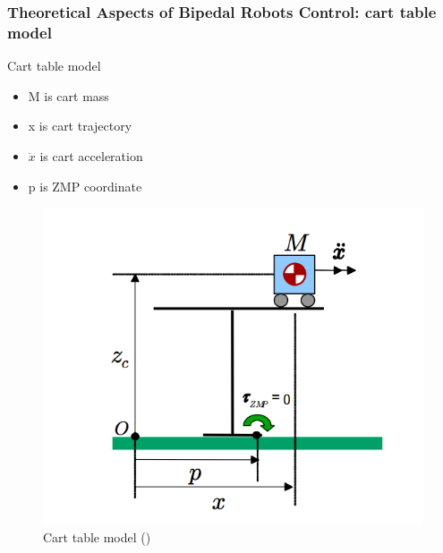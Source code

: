 \documentclass{beamer}
\begin{document}


\begin{frame}
	\frametitle{Theoretical Aspects of Bipedal Robots Control: cart table model}
	\begin{block}{Cart table model}
		\begin{itemize}
			\item
			M is cart mass
			\item
			x is cart trajectory
			\item
			$\ddot{x}$ is cart acceleration
			\item
			p is ZMP coordinate
		\end{itemize}
	\end{block}
	
	\begin{figure}[h!]
		\begin{minipage}[H]{\linewidth}
			\centering
			\includegraphics[width=0.4\linewidth]{presentation_images/11}
			\caption{Cart table model (\cite{kajita2003biped})}
		\end{minipage}
	\end{figure}
\end{frame}

\end{document}
